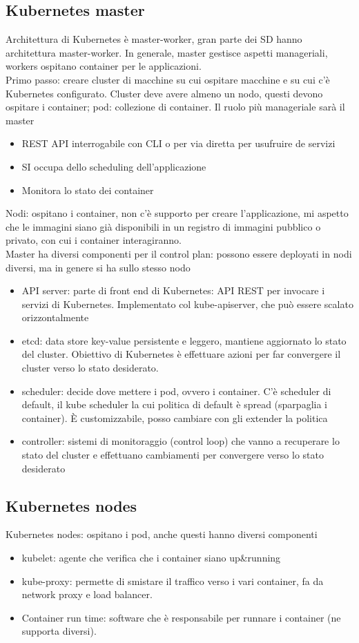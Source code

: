 \documentclass[16px]{article}
\begin{document}
\subsection{Kubernetes master}
Architettura di Kubernetes è master-worker, gran parte dei SD hanno architettura master-worker. In generale, master gestisce aspetti manageriali, workers ospitano container per le applicazioni.\\ Primo passo: creare cluster di macchine su cui ospitare macchine e su cui c'è Kubernetes configurato. Cluster deve avere almeno un nodo, questi devono ospitare i container; pod: collezione di container. Il ruolo più manageriale sarà il master
\begin{itemize}
\item REST API interrogabile con CLI o per via diretta per usufruire de servizi
\item SI occupa dello scheduling dell'applicazione
\item Monitora lo stato dei container
\end{itemize}
Nodi: ospitano i container, non c'è supporto per creare l'applicazione, mi aspetto che le immagini siano già disponibili in un registro di immagini pubblico o privato, con cui i container interagiranno.\\ Master ha diversi componenti per il control plan: possono essere deployati in nodi diversi, ma in genere si ha sullo stesso nodo
\begin{itemize}
\item API server: parte di front end di Kubernetes: API REST per invocare i servizi di Kubernetes. Implementato col kube-apiserver, che può essere scalato orizzontalmente
\item etcd: data store key-value persistente e leggero, mantiene aggiornato lo stato del cluster. Obiettivo di Kubernetes è effettuare azioni per far convergere il cluster verso lo stato desiderato.
\item scheduler: decide dove mettere i pod, ovvero i container. C'è scheduler di default, il kube scheduler la cui politica di default è spread (sparpaglia i container). È customizzabile, posso cambiare con gli extender la politica
\item controller: sistemi di monitoraggio (control loop) che vanno a recuperare lo stato del cluster e effettuano cambiamenti per convergere verso lo stato desiderato
\end{itemize}
\subsection{Kubernetes nodes}
Kubernetes nodes: ospitano i pod, anche questi hanno diversi componenti
\begin{itemize}
\item kubelet: agente che verifica che i container siano up\&running
\item kube-proxy: permette di smistare il traffico verso i vari container, fa da network proxy e load balancer.
\item Container run time: software che è responsabile per runnare i container (ne supporta diversi).
\end{itemize}
\end{document}
